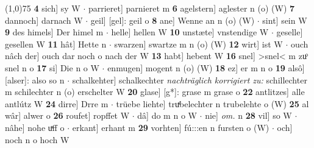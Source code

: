 \documentclass[8pt,a4paper,notitlepage]{article}
\begin{document}
\begin{table}[ht]
\begin{minipage}[t]{0.5\linewidth}
\line(1,0){75} \newline
\textbf{4} sich] sy W  $\cdot$ parrieret] parnieret m \textbf{6} agelstern] aglester n (o) (W) \textbf{7} dannoch] darnach W  $\cdot$ geil] [gel]: geil o \textbf{8} ane] Wenne an n (o) (W)  $\cdot$ sint] sein W \textbf{9} des himels] Der himel m  $\cdot$ helle] hellen W \textbf{10} unstæte] vnstendige W  $\cdot$ geselle] gesellen W \textbf{11} hât] Hette n  $\cdot$ swarzen] swartze m n (o) (W) \textbf{12} wirt] ist W  $\cdot$ ouch nâch der] ouch dar noch o nach der W \textbf{13} habt] hebent W \textbf{16} snel] >snel< m zuͦ snel n o \textbf{17} si] Die n o W  $\cdot$ enmugen] mogent n (o) (W) \textbf{18} ez] er m n o \textbf{19} alsô] [alser]: also so n  $\cdot$ schalkehter] schalkechter \textit{nachträglich korrigiert zu:} schillechter m schilechter n (o) erschelter W \textbf{20} glase] [g*]: grase m grase o \textbf{22} antlitzes] alle antlútz W \textbf{24} dirre] Drre m  $\cdot$ trüebe liehte] truͯbelechter n trubelehte o (W) \textbf{25} al wâr] alwer o \textbf{26} roufet] ropffet W  $\cdot$ dâ] do m n o W  $\cdot$ nie] \textit{om.} n \textbf{28} vil] so W  $\cdot$ nâhe] nohe uͯff o  $\cdot$ erkant] erhant m \textbf{29} vorhten] fú:::en n fursten o (W)  $\cdot$ och] noch n o hoch W \newline
\end{minipage}
\end{table}
\newpage
\end{document}
